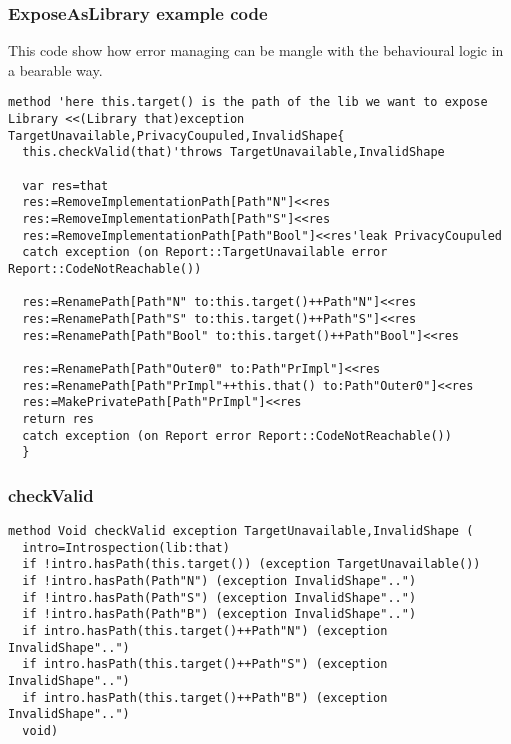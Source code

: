 \begin{frame}[fragile]
\frametitle{ExposeAsLibrary example code}
This code show how error managing can be mangle with 
the behavioural logic in a bearable way.
\begin{NiceCode}{59ex}{0.7}
\begin{lstlisting}
method 'here this.target() is the path of the lib we want to expose
Library <<(Library that)exception TargetUnavailable,PrivacyCoupuled,InvalidShape{
  this.checkValid(that)'throws TargetUnavailable,InvalidShape
  
  var res=that    
  res:=RemoveImplementationPath[Path"N"]<<res
  res:=RemoveImplementationPath[Path"S"]<<res
  res:=RemoveImplementationPath[Path"Bool"]<<res'leak PrivacyCoupuled
  catch exception (on Report::TargetUnavailable error Report::CodeNotReachable())  
  
  res:=RenamePath[Path"N" to:this.target()++Path"N"]<<res
  res:=RenamePath[Path"S" to:this.target()++Path"S"]<<res
  res:=RenamePath[Path"Bool" to:this.target()++Path"Bool"]<<res
  
  res:=RenamePath[Path"Outer0" to:Path"PrImpl"]<<res
  res:=RenamePath[Path"PrImpl"++this.that() to:Path"Outer0"]<<res
  res:=MakePrivatePath[Path"PrImpl"]<<res
  return res
  catch exception (on Report error Report::CodeNotReachable())
  }\end{lstlisting}
\end{NiceCode}

\end{frame}

\begin{frame}[fragile]
\frametitle{checkValid}
\begin{NiceCode}{59ex}{0.7}
\begin{lstlisting}
method Void checkValid exception TargetUnavailable,InvalidShape (
  intro=Introspection(lib:that)
  if !intro.hasPath(this.target()) (exception TargetUnavailable())
  if !intro.hasPath(Path"N") (exception InvalidShape"..")
  if !intro.hasPath(Path"S") (exception InvalidShape"..")
  if !intro.hasPath(Path"B") (exception InvalidShape"..")
  if intro.hasPath(this.target()++Path"N") (exception InvalidShape"..")
  if intro.hasPath(this.target()++Path"S") (exception InvalidShape"..")
  if intro.hasPath(this.target()++Path"B") (exception InvalidShape"..")
  void)
\end{lstlisting}
\end{NiceCode}

\end{frame}


